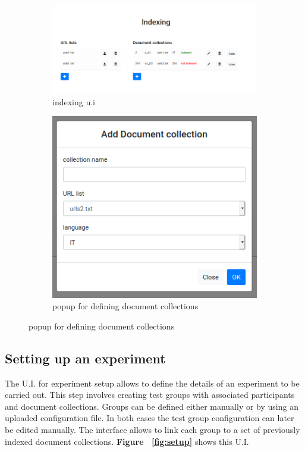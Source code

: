 \documentclass[]{usiinfbachelorproject}
\begin{document}
\begin{figure}[h]
     
     \centering
     \begin{subfigure}[b]{0.6\textwidth}
         \centering
         \includegraphics[width=.8\linewidth]{img/indexing1}
         \caption{indexing  u.i}
         \label{fig:indexingA}
     \end{subfigure}
     \begin{subfigure}[b]{0.3\textwidth}
         \centering
         \includegraphics[width=.6\linewidth]{img/indexing2}
         \caption{popup for defining  document collections}
         \label{fig:indexingB}
     \end{subfigure}

\end{figure}

\subsection{Setting up an experiment}

The U.I. for experiment setup allows to define the details of an experiment to be carried out. This step involves creating
test groups with associated participants and document collections. Groups can be defined either manually or by using an
 uploaded configuration file. In both cases the test group configuration can later be edited manually. 
The interface allows to link each group to a set of previously indexed document collections. 
\textbf{Figure ~\ref{fig:setup}} shows this U.I.
\end{document}

